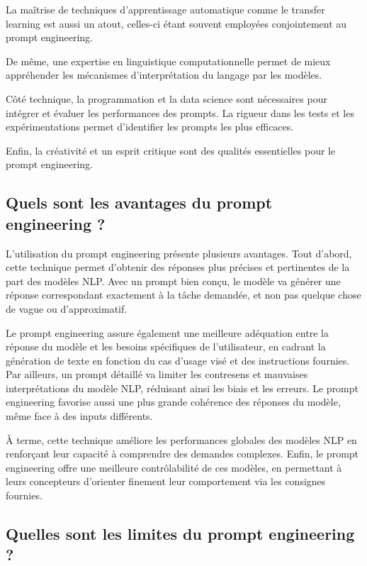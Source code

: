 La maîtrise de techniques d’apprentissage automatique comme le transfer learning
est aussi un atout, celles-ci étant souvent employées conjointement au prompt
engineering.

De même, une expertise en linguistique computationnelle permet de mieux appréhender
les mécanismes d’interprétation du langage par les modèles.

Côté technique, la programmation et la data science sont nécessaires pour
intégrer et évaluer les performances des prompts. La rigueur dans les tests et les
expérimentations permet d’identifier les prompts les plus efficaces.

Enfin, la créativité et un esprit critique sont des qualités essentielles pour
le prompt engineering.

\subsection*{Quels sont les avantages du prompt engineering ?}

L’utilisation du prompt engineering présente plusieurs avantages. Tout d’abord, cette
technique permet d’obtenir des réponses plus précises et pertinentes de la part des
modèles NLP. Avec un prompt bien conçu, le modèle va générer une réponse correspondant
exactement à la tâche demandée, et non pas quelque chose de vague ou
d’approximatif.

Le prompt engineering assure également une meilleure adéquation entre la réponse
du modèle et les besoins spécifiques de l’utilisateur, en cadrant la génération de
texte en fonction du cas d’usage visé et des instructions fournies. Par ailleurs,
un prompt détaillé va limiter les contresens et mauvaises interprétations du modèle
NLP, réduisant ainsi les biais et les erreurs. Le prompt engineering favorise aussi
une plus grande cohérence des réponses du modèle, même face à des inputs
différents.

À terme, cette technique améliore les performances globales des modèles NLP en renforçant
leur capacité à comprendre des demandes complexes. Enfin, le prompt engineering offre
une meilleure contrôlabilité de ces modèles, en permettant à leurs concepteurs
d’orienter finement leur comportement via les consignes fournies.

\subsection*{Quelles sont les limites du prompt engineering ?}

